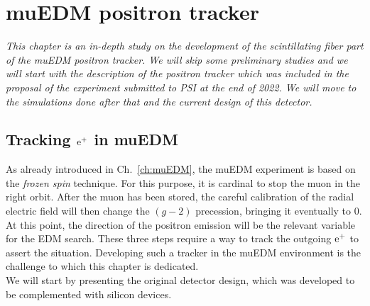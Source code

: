 \chapter{muEDM positron tracker}
\label{ch:muEDM:tracker}
\begin{refsection}
{\itshape This chapter is an in-depth study on the development of the scintillating fiber part of the muEDM positron tracker. 
We will skip some preliminary studies and we will start with the description of the positron tracker which was included in the proposal of the experiment submitted to PSI at the end of 2022. We will move to the simulations done after that and the current design of this detector.}

\section{Tracking $\text{e}^+$ in muEDM}
    As already introduced in Ch.~\ref{ch:muEDM}, the muEDM experiment is based on the \textit{frozen spin} technique.
    For this purpose, it is cardinal to stop the muon in the right orbit. 
    After the muon has been stored, the careful calibration of the radial electric field will then change the $(g-2)$ precession, bringing it eventually to 0.
    At this point, the direction of the positron emission will be the relevant variable for the EDM search.
    These three steps require a way to track the outgoing $\text{e}^+$ to assert the situation.
    Developing such a tracker in the muEDM environment is the challenge to which this chapter is dedicated.\\

    \noindent
    We will start by presenting the original detector design, which was developed to be complemented with silicon devices.


\end{refsection}
